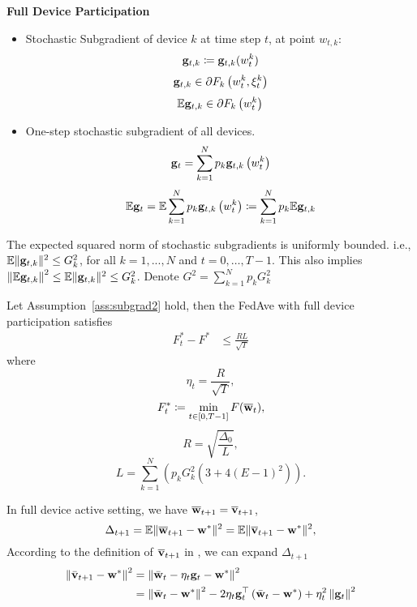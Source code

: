

\textbf{Full Device Participation}

\begin{itemize}
	\item Stochastic Subgradient of device $k$ at time step $t$, at point $w_{t,k}$: 
	$${\mathbf{g}}_{t,k} \coloneqq {\mathbf{g}}_{t,k}(w_t^k)$$
	$$ {\mathbf{g}}_{t, k} \in \partial F_{k}\left(w_{t}^{k}, \xi_{t}^{k}\right) $$
	$$\mathbb{E} {\mathbf{g}}_{t, k} \in \partial F_{k}\left(w_{t}^{k}\right)$$
\item  One-step stochastic subgradient of all devices.
$${\mathbf{g}}_{t}=\sum_{k=1}^{N} p_{k} {\mathbf{g}}_{t, k}\left(w_{t}^{k}\right) $$
\begin{align}
	\mathbb{E} {\mathbf{g}}_{t}= \mathbb{E} \sum_{k=1}^{N} p_{k} {\mathbf{g}}_{t, k}\left(w_{t}^{k}\right) \coloneqq \sum_{k=1}^{N} p_{k} \mathbb{E} {\mathbf{g}}_{t, k}
	\label{eq:egt}
\end{align}
\end{itemize}

\begin{assumption}
The expected squared norm of stochastic subgradients is uniformly bounded. i.e.,
$\mathbb{E}\|{\mathbf{g}}_{t,k}\|^2  \leq G_k^{2}$, for all $k = 1,..., N$ and $t=0, \dots, T-1$.  This also implies $\left\| \mathbb{E}{\mathbf{g}}_{t,k}\right\|^2  \leq \mathbb{E}\|{\mathbf{g}}_{t,k}\|^2 \leq G_k^2$. Denote $G^2 = \sum_{k=1}^N p_k G_k^2$
\label{ass:subgrad2}
\end{assumption}

\begin{theorem}
	Let Assumption~\ref{ass:subgrad2} hold, 
	then the FedAve with full device participation satisfies
	\begin{align}
		 F^*_t - F^* &\leq \frac{RL}{\sqrt{T}}
	\end{align}
	where $$\eta_t = \frac{R}{\sqrt{T}},$$ 
	$$F^*_t \coloneqq \min_{t \in [0, T-1]} F(\overline{{\mathbf{w}}}_t),$$
	$$R = \sqrt{ \frac{\Delta_0}{L}},$$ 
	$$L=\sum_{k=1}^N \left( p_k G_k^2 \left(3 + 4(E-1)^2\right)\right).$$ 
	\label{th:cvxnonsmoth}
\end{theorem}
{} 


In full device active setting, we have $\overline{{\mathbf{w}}}_{t+1}=\overline{{\mathbf{v}}}_{t+1}$,
$$\Delta_{t+1} = \mathbb{E} \|\overline{{\mathbf{w}}}_{t+1} - {\mathbf{w}}^*\|^2 = \mathbb{E} \|\overline{{\mathbf{v}}}_{t+1} - {\mathbf{w}}^*\|^2,$$
According to the definition of $\overline{{\mathbf{v}}}_{t+1}$ in \eq{\ref{eq:vbar}}, we can expand $\Delta_{t+1}$
$$\begin{aligned}\left\|\bar{{\mathbf{v}}}_{t+1}-{\mathbf{w}}^{*}\right\|^2 &=\left\|\bar{{\mathbf{w}}}_{t}-\eta_{t} {\mathbf{g}}_{t}-{\mathbf{w}}^{*}\right\|^2 \\ &=\left\|\bar{{\mathbf{w}}}_{t}-{\mathbf{w}}^{*}\right\|^{2}-2 \eta_{t} {\mathbf{g}}_{t}^{\top}\left(\bar{{\mathbf{w}}}_{t}-{\mathbf{w}}^{*}\right)+\eta_{t}^{2}\left\|{\mathbf{g}}_{t}\right\|^{2} \end{aligned}$$

